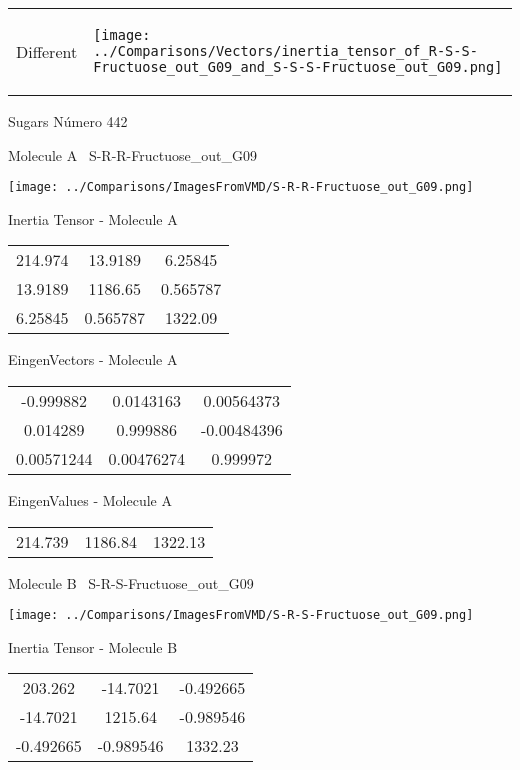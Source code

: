\vtab[-5mm]
\begin{tabular}{*{2}{m{}}}
\begin{center}
\textcolor{NavyBlue}{\Large Different}
\end{center}
&
\begin{center}
\texttt{[image: ../Comparisons/Vectors/inertia\_tensor\_of\_R-S-S-Fructuose\_out\_G09\_and\_S-S-S-Fructuose\_out\_G09.png]}
\end{center}
\end{tabular}

 \newpage

\vtab[-3cm]
\begin{center}
{\large Sugars \tab Número 442}
\end{center}
\begin{multicols}{2}
\begin{center}

Molecule A \
S-R-R-Fructuose\_out\_G09

\texttt{[image: ../Comparisons/ImagesFromVMD/S-R-R-Fructuose\_out\_G09.png]}

Inertia Tensor - Molecule A \\
\begin{tabular}{|c c c|}
214.974	 & 	13.9189	 & 	6.25845	 \\
13.9189	 & 	1186.65	 & 	0.565787	 \\
6.25845	 & 	0.565787	 & 	1322.09
\end{tabular}

\vtab
 EingenVectors - Molecule A     \\
\begin{tabular}{|c c c|}
-0.999882	 & 	0.0143163	 & 	0.00564373	 \\
0.014289	 & 	0.999886	 & 	-0.00484396	 \\
0.00571244	 & 	0.00476274	 & 	0.999972
\end{tabular}

\vtab
 EingenValues - Molecule A     \\
\begin{tabular}{|c c c|}
214.739	 & 	1186.84	 & 	1322.13	 \\
\end{tabular}
\columnbreak

Molecule B \
S-R-S-Fructuose\_out\_G09

\texttt{[image: ../Comparisons/ImagesFromVMD/S-R-S-Fructuose\_out\_G09.png]}

Inertia Tensor - Molecule B \\
\begin{tabular}{|c c c|}
203.262	 & 	-14.7021	 & 	-0.492665	 \\
-14.7021	 & 	1215.64	 & 	-0.989546	 \\
-0.492665	 & 	-0.989546	 & 	1332.23
\end{tabular}


\end{center}
\end{multicols}
